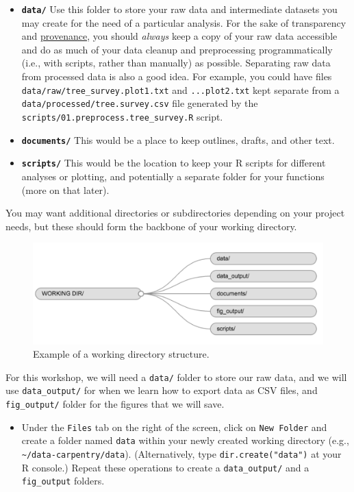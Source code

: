 \documentclass[]{book}
\providecommand{\tightlist}{%
  \setlength{\itemsep}{0pt}\setlength{\parskip}{0pt}}
\begin{document}
\begin{itemize}
\tightlist
\item
  \textbf{\texttt{data/}} Use this folder to store your raw data and
  intermediate datasets you may create for the need of a particular
  analysis. For the sake of transparency and
  \href{https://en.wikipedia.org/wiki/Provenance}{provenance}, you
  should \emph{always} keep a copy of your raw data accessible and do as
  much of your data cleanup and preprocessing programmatically (i.e.,
  with scripts, rather than manually) as possible. Separating raw data
  from processed data is also a good idea. For example, you could have
  files \texttt{data/raw/tree\_survey.plot1.txt} and
  \texttt{...plot2.txt} kept separate from a
  \texttt{data/processed/tree.survey.csv} file generated by the
  \texttt{scripts/01.preprocess.tree\_survey.R} script.
\item
  \textbf{\texttt{documents/}} This would be a place to keep outlines,
  drafts, and other text.
\item
  \textbf{\texttt{scripts/}} This would be the location to keep your R
  scripts for different analyses or plotting, and potentially a separate
  folder for your functions (more on that later).
\end{itemize}

You may want additional directories or subdirectories depending on your
project needs, but these should form the backbone of your working
directory.

\begin{figure}
\centering
\includegraphics{img/working-directory-structure.png}
\caption{Example of a working directory structure.}
\end{figure}

For this workshop, we will need a \texttt{data/} folder to store our raw
data, and we will use \texttt{data\_output/} for when we learn how to
export data as CSV files, and \texttt{fig\_output/} folder for the
figures that we will save.

\begin{itemize}
\tightlist
\item
  Under the \texttt{Files} tab on the right of the screen, click on
  \texttt{New\ Folder} and create a folder named \texttt{data} within
  your newly created working directory (e.g.,
  \texttt{\textasciitilde{}/data-carpentry/data}). (Alternatively, type
  \texttt{dir.create("data")} at your R console.) Repeat these
  operations to create a \texttt{data\_output/} and a
  \texttt{fig\_output} folders.
\end{itemize}
\end{document}

